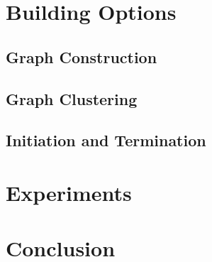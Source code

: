 \documentclass[12pt, oneside, extrafontsizes]{memoir}  %
\theoremstyle{plain}
\theoremstyle{definition}
\begin{document}
\chapter{Building Options}
\section{Graph Construction}
\section{Graph Clustering}
\section{Initiation and Termination}

\chapter{Experiments}

\chapter{Conclusion}




\printindex
\end{document}
